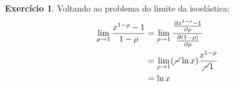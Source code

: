 \documentclass[12pt]{article}
\numberwithin{equation}{section}
\theoremstyle{plain}
\theoremstyle{definition}
\newtheorem{exercise}{Exercício}
\theoremstyle{remark}
\begin{document}
\begin{exercise}
  Voltando ao problema do limite da isoelástica:
    \begin{align*}
    \lim\limits_{\rho  \to 1} \frac{x^{1-\rho }-1}{1-\rho } &= \lim\limits_{\rho  \to 1} \frac{\frac{ \partial x^{1-\rho }-1 }{ \partial \rho }}{\frac{ \partial (1-\rho) }{ \partial \rho } } \\
    &= \lim\limits_{\rho  \to 1} (\cancel{-} \ln x) \frac{x^{1-\rho }}{\cancel{-}1 } \\
    &= \ln x
  \end{align*}


\end{exercise}



\printbibliography
\end{document}
